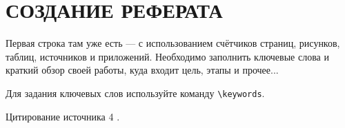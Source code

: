 \section{СОЗДАНИЕ РЕФЕРАТА}

Первая строка там уже есть --- с использованием счётчиков страниц, рисунков, 
таблиц, источников и приложений. 
Необходимо заполнить ключевые слова и краткий обзор своей работы, 
куда входит цель, этапы и прочее...

Для задания ключевых слов используйте команду \texttt{\textbackslash keywords}.

Цитирование источника 4 \cite{Wikipedia4} \cite{cite_1_2} \cite{cite_1_15} \cite{cite_1_16}.
